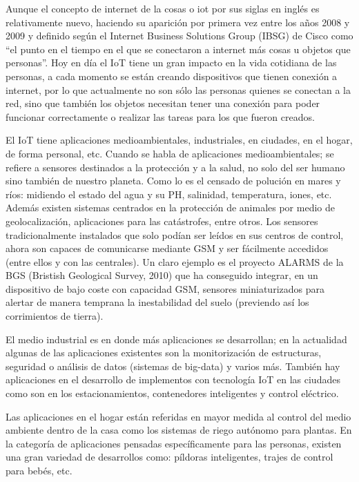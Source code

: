 


Aunque el concepto de internet de la cosas o \gls{iot} por sus siglas en inglés es relativamente nuevo, haciendo su aparición por primera vez entre los años 2008 y 2009\cite{Evans2011TheEverything} y definido según el Internet Business Solutions Group (IBSG) de Cisco como “el punto en el tiempo en el que se conectaron a internet más cosas u objetos que personas”\cite{Alcaraz2014InternetCosas}. Hoy en día el IoT tiene un gran impacto en la vida cotidiana de las personas, a cada momento se están creando dispositivos que tienen conexión a internet, por lo que actualmente no son sólo las personas quienes se conectan a la red, sino que también los objetos necesitan tener una conexión para poder funcionar correctamente o realizar las tareas para los que fueron creados. 

El IoT tiene aplicaciones medioambientales, industriales, en ciudades, en el hogar, de forma personal, etc.  Cuando se habla de aplicaciones medioambientales; se refiere a sensores destinados a la protección y a la salud, no solo del ser humano sino también de nuestro planeta. Como lo es el censado de polución en mares y ríos: midiendo el estado del agua y su PH, salinidad, temperatura, iones, etc. Además existen sistemas centrados en la protección de animales por medio de geolocalización, aplicaciones para las catástrofes, entre otros. Los sensores tradicionalmente instalados que solo podían ser leídos en sus centros de control, ahora son capaces de comunicarse mediante GSM y ser fácilmente accedidos (entre ellos y con las centrales). Un claro ejemplo es el proyecto ALARMS de la BGS (Bristish Geological Survey, 2010) que ha conseguido integrar, en un dispositivo de bajo coste con capacidad GSM, sensores miniaturizados para alertar de manera temprana la inestabilidad del suelo (previendo así los corrimientos de tierra)\cite{Valle2014}.

El medio industrial es en donde más aplicaciones se desarrollan; en la actualidad algunas de las aplicaciones existentes son la monitorización de estructuras, seguridad o análisis de datos (sistemas de big-data) y varios más. También hay aplicaciones en el desarrollo de implementos con tecnología IoT en las ciudades como son en los estacionamientos, contenedores inteligentes y control eléctrico.  

Las aplicaciones en el hogar están referidas en mayor medida al control del medio ambiente dentro de la casa como los sistemas de riego autónomo para plantas. En la categoría de aplicaciones pensadas específicamente para las personas, existen una gran variedad de desarrollos como: píldoras inteligentes, trajes de control para bebés, etc\cite{Valle2014}.

